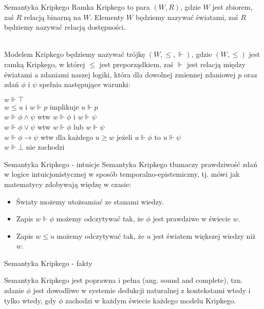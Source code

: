 \documentclass{beamer}
\newcommand{\impl}{\rightarrow}
\begin{document}
\begin{frame}{Semantyka Kripkego}
Ramka Kripkego to para $(W, R)$, gdzie $W$ jest zbiorem, zaś $R$ relacją binarną na $W$. Elementy $W$ będziemy nazywać światami, zaś $R$ będziemy nazywać relacją dostępności. \\~\

Modelem Kripkego będziemy nazywać trójkę $(W, \leq, \Vdash)$, gdzie $(W, \leq)$ jest ramką Kripkego, w której $\leq$ jest preporządkiem, zaś $\Vdash$ jest relacją między światami a zdaniami naszej logiki, która dla dowolnej zmiennej zdaniowej $p$ oraz zdań $\phi$ i $\psi$ spełnia następujące warunki: \\
\begin{center}
$w \Vdash \top$ \\
$w \leq u$ i $w \Vdash p$ implikuje $u \Vdash p$ \\
$w \Vdash \phi \land \psi$ wtw $w \Vdash \phi$ i $w \Vdash \psi$ \\
$w \Vdash \phi \lor \psi$ wtw $w \Vdash \phi$ lub $w \Vdash \psi$ \\
$w \Vdash \phi \impl \psi$ wtw dla każdego $u \geq w$ jeżeli $u \Vdash \phi$ to $u \Vdash \psi$ \\
$w \Vdash \bot$ nie zachodzi
\end{center}
\end{frame}

\begin{frame}{Semantyka Kripkego - intuicje}
Semantyka Kripkego tłumaczy prawdziwość zdań w logice intuicjonistycznej w sposób temporalno-epistemiczny, tj. mówi jak matematycy zdobywają więdzę w czasie: \\
\begin{itemize}
	\item Światy możemy utożsamiać ze stanami wiedzy. \\
	\item Zapis $w \Vdash \phi$ możemy odczytywać tak, że $\phi$ jest prawdziwe w świecie $w$. \\
	\item Zapis $w \leq u$ możemy odczytywać tak, że $u$ jest światem większej wiedzy niż $w$.
\end{itemize}
\end{frame}

\begin{frame}{Semantyka Kripkego - fakty}
\begin{theorem}
Semantyka Kripkego jest poprawna i pełna (ang. sound and complete), tzn. zdanie $\phi$ jest dowodliwe w systemie dedukcji naturalnej z kontekstami wtedy i tylko wtedy, gdy $\phi$ zachodzi w każdym świecie każdego modelu Kripkego.
\end{theorem}
\end{frame}
\end{document}
